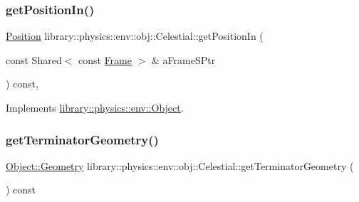 \subsubsection{\texorpdfstring{get\+Position\+In()}{getPositionIn()}}
{\footnotesize\ttfamily \hyperlink{classlibrary_1_1physics_1_1coord_1_1_position}{Position} library\+::physics\+::env\+::obj\+::\+Celestial\+::get\+Position\+In (\begin{DoxyParamCaption}\item[{const Shared$<$ const \hyperlink{classlibrary_1_1physics_1_1coord_1_1_frame}{Frame} $>$ \&}]{a\+Frame\+S\+Ptr }\end{DoxyParamCaption}) const\hspace{0.3cm}{\ttfamily [override]}, {\ttfamily [virtual]}}



Implements \hyperlink{classlibrary_1_1physics_1_1env_1_1_object_acc86d12ad94de870fc2684f7b768b617}{library\+::physics\+::env\+::\+Object}.

\mbox{\label{classlibrary_1_1physics_1_1env_1_1obj_1_1_celestial_aa910ed14605693ee5af68d88015cd53b}} 
\subsubsection{\texorpdfstring{get\+Terminator\+Geometry()}{getTerminatorGeometry()}}
{\footnotesize\ttfamily \hyperlink{classlibrary_1_1physics_1_1env_1_1_object_abdf50733c7ad97327fb64edca5670f13}{Object\+::\+Geometry} library\+::physics\+::env\+::obj\+::\+Celestial\+::get\+Terminator\+Geometry (\begin{DoxyParamCaption}{ }\end{DoxyParamCaption}) const}

\mbox{\label{classlibrary_1_1physics_1_1env_1_1obj_1_1_celestial_ac6676b10ebbb63a8483137c9c734c58a}} 

